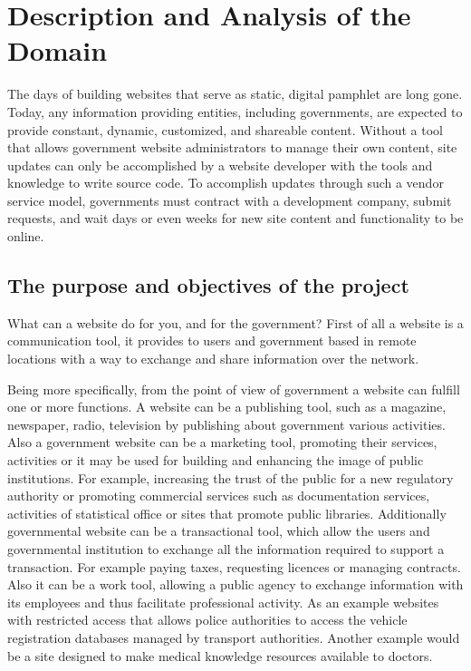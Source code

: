  \section{Description and Analysis of the Domain}

The days of building websites that serve as static, digital pamphlet are long gone. Today, any information providing entities, including governments, are expected to provide constant, dynamic, customized, and shareable content. Without a tool that allows government website administrators to manage their own content, site updates can only be accomplished by a website developer with the tools and knowledge to write source code. To accomplish updates through such a vendor service model, governments must contract with a development company, submit requests, and wait days or even weeks for new site content and functionality to be online.

\subsection{The purpose and objectives of the project}
What can a website do for you, and for the government? First of all a website is a communication tool, it provides to users and government based in remote locations with a way to exchange and share information over the network.

Being more specifically, from the point of view of government a website can fulfill one or more functions. A website can be a publishing tool, such as a magazine, newspaper, radio, television by publishing about government various activities. Also a government website can be a marketing tool, promoting their services, activities or it may be used for building and enhancing the image of public institutions. For example, increasing the trust of the public for a new regulatory authority or promoting commercial services such as documentation services, activities of statistical office or sites that promote public libraries. Additionally governmental website can be a transactional tool, which allow the users and governmental institution to exchange all the information required to support a transaction. For example paying taxes, requesting licences or managing contracts. Also it can be a work tool, allowing a public agency to exchange information with its employees and thus facilitate professional activity. As an example websites with restricted access that allows police authorities to access the vehicle registration databases managed by transport authorities. Another example would be a site designed to make medical knowledge resources available to doctors.

